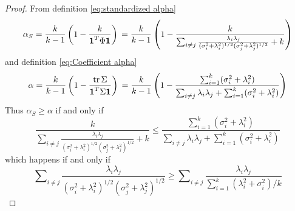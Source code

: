 \documentclass[twoside]{article}
\DeclareMathOperator{\tr}{tr}
\DeclareMathOperator{\tsum}{\textstyle \sum}
\renewcommand{\sqrt}[1]{{(#1)^{1/2}}}
\begin{document}
\begin{proof}
From definition \eqref{eq:standardized alpha}
\begin{equation*}
\alpha_S = \frac{k}{k-1}\left(1-\frac{k}{\boldsymbol{1}^{T}\Phi\boldsymbol{1}}\right)\\
 = \frac{k}{k-1}\left(1-\frac{k}{\tsum_{i\neq j}\frac{\lambda_{i}\lambda_{j}}{\sqrt{\sigma_{i}^{2}+\lambda_{i}^{2}}\sqrt{\sigma_{j}^{2}+\lambda_{j}^{2}}}+k}\right)
\end{equation*}
and definition \eqref{eq:Coefficient alpha}
\begin{equation*}
\alpha = \frac{k}{k-1}\left(1-\frac{\tr\Sigma}{\boldsymbol{1}^{T}\Sigma\boldsymbol{1}}\right)\\
 = \frac{k}{k-1}\left(1-\frac{\tsum_{i=1}^{k}(\sigma_{i}^{2}+\lambda_{i}^{2})}{\tsum_{i\neq j}\lambda_{i}\lambda_{j}+\tsum_{i=1}^{k}(\sigma_{i}^{2}+\lambda_{i}^{2})}\right)
\end{equation*}
Thus $\alpha_S\geq\alpha$ if and only if
\[
\frac{k}{\tsum_{i\neq j}\frac{\lambda_{i}\lambda_{j}}{\sqrt{\sigma_{i}^{2}+\lambda_{i}^{2}}\sqrt{\sigma_{j}^{2}+\lambda_{j}^{2}}}+k}\leq\frac{\tsum_{i=1}^{k}(\sigma_{i}^{2}+\lambda_{i}^{2})}{\tsum_{i\neq j}\lambda_{i}\lambda_{j}+\tsum_{i=1}^{k}(\sigma_{i}^{2}+\lambda_{i}^{2})}
\]
which happens if and only if 
\[
\tsum_{i\neq j}\frac{\lambda_{i}\lambda_{j}}{\sqrt{\sigma_{i}^{2}+\lambda_{i}^{2}}\sqrt{\sigma_j^{2}+\lambda_{j}^{2}}}\geq\tsum_{i\neq j}\frac{\lambda_{i}\lambda_{j}}{\tsum_{i=1}^{k}(\lambda_{i}^{2}+\sigma_{i}^{2})/k}
\]
\end{proof}
\end{document}
